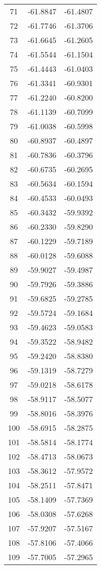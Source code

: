 \documentclass{article}
\begin{document}
\begin{longtable}{|c|c|c|}
71 & -61.8847 & -61.4807 \\
72 & -61.7746 & -61.3706 \\
73 & -61.6645 & -61.2605 \\
74 & -61.5544 & -61.1504 \\
75 & -61.4443 & -61.0403 \\
76 & -61.3341 & -60.9301 \\
77 & -61.2240 & -60.8200 \\
78 & -61.1139 & -60.7099 \\
79 & -61.0038 & -60.5998 \\
80 & -60.8937 & -60.4897 \\
81 & -60.7836 & -60.3796 \\
82 & -60.6735 & -60.2695 \\
83 & -60.5634 & -60.1594 \\
84 & -60.4533 & -60.0493 \\
85 & -60.3432 & -59.9392 \\
86 & -60.2330 & -59.8290 \\
87 & -60.1229 & -59.7189 \\
88 & -60.0128 & -59.6088 \\
89 & -59.9027 & -59.4987 \\
90 & -59.7926 & -59.3886 \\
91 & -59.6825 & -59.2785 \\
92 & -59.5724 & -59.1684 \\
93 & -59.4623 & -59.0583 \\
94 & -59.3522 & -58.9482 \\
95 & -59.2420 & -58.8380 \\
96 & -59.1319 & -58.7279 \\
97 & -59.0218 & -58.6178 \\
98 & -58.9117 & -58.5077 \\
99 & -58.8016 & -58.3976 \\
100 & -58.6915 & -58.2875 \\
101 & -58.5814 & -58.1774 \\
102 & -58.4713 & -58.0673 \\
103 & -58.3612 & -57.9572 \\
104 & -58.2511 & -57.8471 \\
105 & -58.1409 & -57.7369 \\
106 & -58.0308 & -57.6268 \\
107 & -57.9207 & -57.5167 \\
108 & -57.8106 & -57.4066 \\
109 & -57.7005 & -57.2965 \\

\end{longtable}
\end{document}
